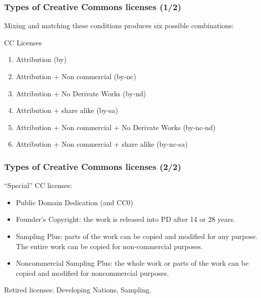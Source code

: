 \begin{frame}
\frametitle{Types of Creative Commons licenses (1/2)}

Mixing and matching these conditions produces six possible combinations:

\begin{block}{CC Licenses}
\begin{enumerate}
\item Attribution (by)
\item Attribution + Non commercial (by-nc)
\item Attribution + No Derivate Works (by-nd)
\item Attribution + share alike (by-sa)
\item Attribution + Non commercial + No Derivate Works (by-nc-nd)
\item Attribution + Non commercial + share alike (by-nc-sa)
\end{enumerate}                                                 
\end{block}
\end{frame}


\begin{frame}
\frametitle{Types of Creative Commons licenses (2/2)}

``Special'' CC licenses:
\begin{itemize}
\item Public Domain Dedication (and CC0)
\item \alert{Founder's Copyright:} the work is released into PD after 14 or 28 years.
\item \alert{Sampling Plus:} parts of the work can be copied and modified for any purpose. The entire work can be copied for non-commercial purposes.
\item \alert{Noncommercial Sampling Plus:} the whole work or parts of the work can be copied and modified for noncommercial purposes. 
\end{itemize}                                                 

Retired licenses: Developing Nations, Sampling.

\end{frame}


